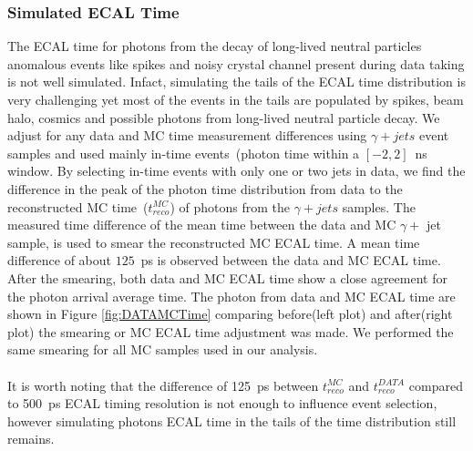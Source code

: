 \subsubsection*{Simulated ECAL Time}
The ECAL time for photons from the decay of long-lived neutral particles anomalous events like spikes and noisy crystal channel  present during data taking is not well simulated. Infact, simulating the tails of the ECAL time distribution is very challenging yet most of the events in the tails are populated by spikes, beam halo, cosmics and possible photons from long-lived neutral particle decay.
We adjust for any data and MC time measurement differences using $\gamma + jets$  event samples and used mainly in-time events~(photon time within a $[-2, 2 ]$~ns window.
By selecting in-time events with only one or two jets in data, we find the difference in the peak of the photon time distribution from data to the reconstructed MC time~($t^{MC}_{reco}$) of photons from the $\gamma + jets$ samples. The measured time difference of the mean time between the data and MC $\gamma +$ jet sample, is used to smear the reconstructed MC ECAL time. A mean time difference of about $125$~ps is observed between the data and MC ECAL time. After the smearing, both data and MC ECAL time show a close agreement for the photon arrival  average time. The photon from data and MC ECAL time are shown in Figure \ref{fig:DATAMCTime} comparing before(left plot) and after(right plot) the smearing or MC ECAL time adjustment was made. We performed the same smearing for all MC samples used in our analysis.
\paragraph*{}
 It is worth noting that the difference of 125~ps between $t^{MC}_{reco}$ and $t^{DATA}_{reco}$ compared to 500~ps ECAL timing resolution is not enough to influence event selection, however simulating photons ECAL time in the tails of the time distribution still remains.
